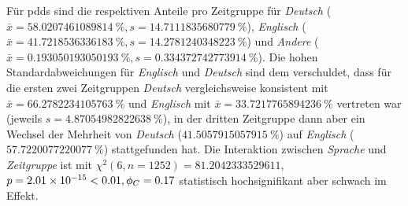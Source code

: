 Für \glspl{pdd} sind die respektiven Anteile pro Zeitgruppe für \textit{Deutsch} ($\bar{x}=\SI[round-mode=places,round-precision=2]{58.0207461089814}{\percent},s=\SI[round-mode=places,round-precision=2]{14.7111835680779}{\percent}$), \textit{Englisch} ($\bar{x}=\SI[round-mode=places,round-precision=2]{41.7218536336183}{\percent},s=\SI[round-mode=places,round-precision=2]{14.2781240348223}{\percent}$) und \textit{Andere} ($\bar{x}=\SI[round-mode=places,round-precision=2]{0.193050193050193}{\percent},s=\SI[round-mode=places,round-precision=2]{0.334372742773914}{\percent}$).
Die hohen Standardabweichungen für \textit{Englisch} und \textit{Deutsch} sind dem verschuldet, dass für die ersten zwei Zeitgruppen \textit{Deutsch} vergleichsweise konsistent mit $\bar{x}=\SI[round-mode=places,round-precision=2]{66.2782234105763}{\percent}$ und \textit{Englisch} mit $\bar{x}=\SI[round-mode=places,round-precision=2]{33.7217765894236}{\percent}$  vertreten war (jeweils $s=\SI[round-mode=places,round-precision=2]{4.87054982822638}{\percent}$), in der dritten Zeitgruppe dann aber ein Wechsel der Mehrheit von \textit{Deutsch} ($\SI[round-mode=places,round-precision=2]{41.5057915057915}{\percent}$) auf \textit{Englisch} ($\SI[round-mode=places,round-precision=2]{57.7220077220077}{\percent}$) stattgefunden hat.
Die Interaktion zwischen \textit{Sprache} und \textit{Zeitgruppe} ist mit $\chi^2 (\num{6}, n=\num{1252}) = \num[round-mode=places,round-precision=2]{81.2042333529611}$, $p = \num[round-mode=places,round-precision=2]{2.01454276715493E-15}<\num{0.01},\phi_C=\num[round-mode=places,round-precision=2]{0.16785811702362}$ statistisch hochsignifikant aber schwach im Effekt.

